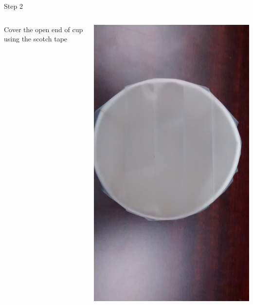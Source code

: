 \begin{frame}{Step 2}
  \begin{columns}
    \begin{column}{0.6\textwidth}
      Cover the open end of cup using the scotch tape
    \end{column}
    \begin{column}{0.4\textwidth}
      \includegraphics[width=\textwidth,trim=0 8in 0 4in,clip]{media/coveredlid2.jpg}\\

\end{column}
\end{columns}
\end{frame}
